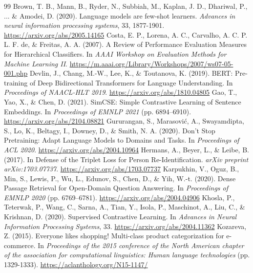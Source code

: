 \documentclass[12pt,a4paper]{report}
\begin{document}
\cleardoublepage 
{} 
{} 
\label{chap:bibliography}
\begin{thebibliography}{99}
     Brown, T. B., Mann, B., Ryder, N., Subbiah, M., Kaplan, J. D., Dhariwal, P., ... \& Amodei, D. (2020). Language models are few-shot learners. \textit{Advances in neural information processing systems}, 33, 1877-1901. \url{https://arxiv.org/abs/2005.14165}
     Costa, E. P., Lorena, A. C., Carvalho, A. C. P. L. F. de, \& Freitas, A. A. (2007). A Review of Performance Evaluation Measures for Hierarchical Classifiers. In \textit{AAAI Workshop on Evaluation Methods for Machine Learning II}. \url{https://m.aaai.org/Library/Workshops/2007/ws07-05-001.php}
     Devlin, J., Chang, M.-W., Lee, K., \& Toutanova, K. (2019). BERT: Pre-training of Deep Bidirectional Transformers for Language Understanding. In \textit{Proceedings of NAACL-HLT 2019}. \url{https://arxiv.org/abs/1810.04805}
     Gao, T., Yao, X., \& Chen, D. (2021). SimCSE: Simple Contrastive Learning of Sentence Embeddings. In \textit{Proceedings of EMNLP 2021} (pp. 6894--6910). \url{https://arxiv.org/abs/2104.08821}
     Gururangan, S., Marasović, A., Swayamdipta, S., Lo, K., Beltagy, I., Downey, D., \& Smith, N. A. (2020). Don't Stop Pretraining: Adapt Language Models to Domains and Tasks. In \textit{Proceedings of ACL 2020}. \url{https://arxiv.org/abs/2004.10964}
     Hermans, A., Beyer, L., \& Leibe, B. (2017). In Defense of the Triplet Loss for Person Re-Identification. \textit{arXiv preprint arXiv:1703.07737}. \url{https://arxiv.org/abs/1703.07737}
     Karpukhin, V., Oguz, B., Min, S., Lewis, P., Wu, L., Edunov, S., Chen, D., \& Yih, W.-t. (2020). Dense Passage Retrieval for Open-Domain Question Answering. In \textit{Proceedings of EMNLP 2020} (pp. 6769--6781). \url{https://arxiv.org/abs/2004.04906}
     Khosla, P., Teterwak, P., Wang, C., Sarna, A., Tian, Y., Isola, P., Maschinot, A., Liu, C., \& Krishnan, D. (2020). Supervised Contrastive Learning. In \textit{Advances in Neural Information Processing Systems}, 33. \url{https://arxiv.org/abs/2004.11362}
     Kozareva, Z. (2015). Everyone likes shopping! Multi-class product categorization for e-commerce. In \textit{Proceedings of the 2015 conference of the North American chapter of the association for computational linguistics: Human language technologies} (pp. 1329-1333). \url{https://aclanthology.org/N15-1147/}

\end{thebibliography}
\end{document}
